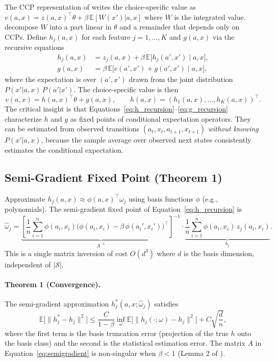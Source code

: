 \documentclass[10pt]{article}
\newcommand{\E}{\mathbb{E}}
\newcommand{\calS}{\mathcal{S}}
\begin{document}
The CCP representation of \citet{hotzMiller1993} writes the choice-specific value as $v(a,x) = z(a,x)^\top\theta + \beta\,\E[W(x')|a,x]$ where $W$ is the integrated value. \citet{adusumilliEckardt2025} decompose $W$ into a part linear in $\theta$ and a remainder that depends only on CCPs. Define $h_j(a,x)$ for each feature $j = 1,\ldots,K$ and $g(a,x)$ via the recursive equations
\begin{align}
h_j(a,x) &= z_j(a,x) + \beta\,\E\bigl[h_j(a',x') \mid a,x\bigr], \label{eq:h_recursion} \\
g(a,x) &= \beta\,\E\bigl[e(a',x') + g(a',x') \mid a,x\bigr], \label{eq:g_recursion}
\end{align}
where the expectation is over $(a',x')$ drawn from the joint distribution $P(x'|a,x)\,P(a'|x')$. The choice-specific value is then
\begin{equation}
\label{eq:csv_decomp}
v(a,x) = h(a,x)^\top \theta + g(a,x), \qquad h(a,x) = (h_1(a,x), \ldots, h_K(a,x))^\top.
\end{equation}
The critical insight is that Equations~\eqref{eq:h_recursion}--\eqref{eq:g_recursion} characterize $h$ and $g$ as fixed points of conditional expectation operators. They can be estimated from observed transitions $(a_t, x_t, a_{t+1}, x_{t+1})$ \emph{without knowing $P(x'|a,x)$}, because the sample average over observed next states consistently estimates the conditional expectation.


\subsection{Semi-Gradient Fixed Point (Theorem 1)}

Approximate $h_j(a,x) \approx \phi(a,x)^\top \omega_j$ using basis functions $\phi$ (e.g., polynomials). The semi-gradient fixed point of Equation~\eqref{eq:h_recursion} is
\begin{equation}
\label{eq:semigradient}
\hat\omega_j = \underbrace{\left[\frac{1}{n}\sum_{i=1}^n \phi(a_i,x_i)\bigl(\phi(a_i,x_i) - \beta\,\phi(a_i',x_i')\bigr)^\top\right]^{-1}}_{A^{-1}} \cdot \underbrace{\frac{1}{n}\sum_{i=1}^n \phi(a_i,x_i)\, z_j(a_i,x_i)}_{b_j}.
\end{equation}
This is a single matrix inversion of cost $O(d^3)$ where $d$ is the basis dimension, independent of $|\calS|$.

\paragraph{Theorem 1 (Convergence).}
The semi-gradient approximation $h^*_j(a,x; \hat\omega_j)$ satisfies
\begin{equation}
\E\bigl[\|h^*_j - h_j\|^2\bigr] \leq \frac{C}{1-\beta} \inf_\omega \E\bigl[\|h_j(\cdot;\omega) - h_j\|^2\bigr] + C\sqrt{\frac{d}{n}},
\end{equation}
where the first term is the basis truncation error (projection of the true $h$ onto the basis class) and the second is the statistical estimation error. The matrix $A$ in Equation~\eqref{eq:semigradient} is non-singular when $\beta < 1$ (Lemma 2 of \citealt{adusumilliEckardt2025}).
\end{document}
